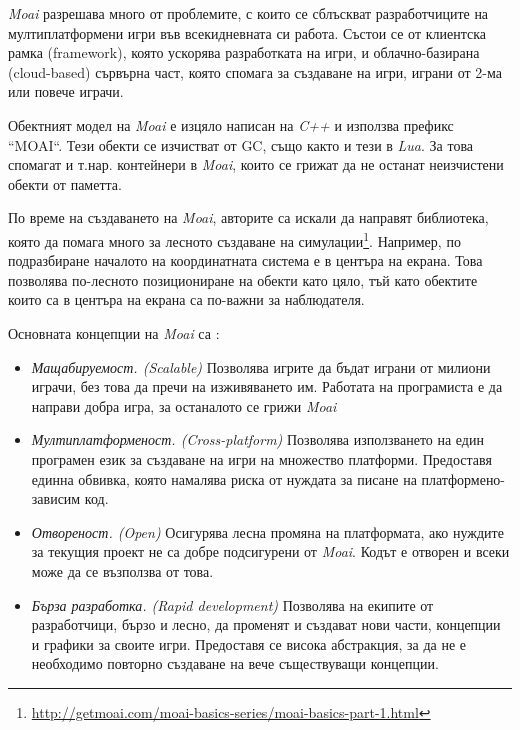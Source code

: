 		\emph{Moai} разрешава много от проблемите, с които се сблъскват разработчиците на мултиплатформени 
		игри във всекидневната си работа. Състои се от клиентска рамка (framework), която ускорява разработката
		на игри, и облачно-базирана (cloud-based) сървърна част, която спомага за създаване на игри, играни от 2-ма
		или повече играчи.

		Обектният модел на \emph{Moai} е изцяло написан на \emph{C++} и използва префикс ``MOAI``. Тези обекти
		се изчистват от \ac{GC}, също както и тези в \emph{Lua}. За това спомагат и т.нар. контейнери в \emph{Moai},
		които се грижат да не останат неизчистени обекти от паметта.
		
		По време на създаването на \emph{Moai}, авторите са искали да направят библиотека, която да помага много
		за лесното създаване на симулации\footnote{\url{http://getmoai.com/moai-basics-series/moai-basics-part-1.html}}.
		Например, по подразбиране началото на координатната система е в центъра на екрана. Това позволява по-лесното
		позициониране на обекти като цяло, тъй като обектите които са в центъра на екрана са по-важни за наблюдателя.
		
		Основната концепции на \emph{Moai} са \cite{Zipline}:
		
		\begin{itemize}

			\item \emph{Мащабируемост. (Scalable)} Позволява игрите да бъдат играни от милиони играчи, без това
			да пречи на изживяването им. Работата на програмиста е да направи добра игра, за останалото се грижи
			\emph{Moai} 
			
			\item \emph{Мултиплатформеност. (Cross-platform)} Позволява използването на един програмен език за
			създаване на игри на множество платформи. Предоставя единна обвивка, която намалява риска от нуждата за
			писане на платформено-зависим код.
			
			\item \emph{Отвореност. (Open)} Осигурява лесна промяна на платформата, ако нуждите за текущия
			проект не са добре подсигурени от \emph{Moai}. Кодът е отворен и всеки може да се възползва от това.
			
			\item \emph{Бърза разработка. (Rapid development)} Позволява на екипите от разработчици, бързо и лесно, да
			променят и създават нови части, концепции и графики за своите игри. Предоставя се висока абстракция, за да не е
			необходимо повторно създаване на вече съществуващи концепции.
			
		\end{itemize}
		
